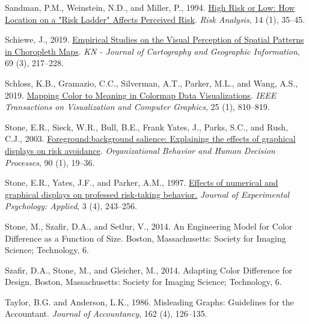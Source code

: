 \documentclass[
]{interact}
\newlength{\cslhangindent}
\newlength{\cslentryspacingunit} %
\newenvironment{CSLReferences}[2] %
 {%
  \setlength{\parindent}{0pt}
  \ifodd #1
  \let\oldpar\par
  \def\par{\hangindent=\cslhangindent\oldpar}
  \fi
  \setlength{\parskip}{#2\cslentryspacingunit}
 }%
 {}
\begin{document}
\begin{CSLReferences}{1}{0}
\leavevmode{}%
Sandman, P.M., Weinstein, N.D., and Miller, P., 1994.
\href{https://doi.org/10.1111/j.1539-6924.1994.tb00026.x}{High {Risk} or
{Low}: {How} {Location} on a "{Risk} {Ladder}" {Affects} {Perceived}
{Risk}}. \emph{Risk Analysis}, 14 (1), 35--45.

\leavevmode{}%
Schiewe, J., 2019.
\href{https://doi.org/10.1007/s42489-019-00026-y}{Empirical {Studies} on
the {Visual} {Perception} of {Spatial} {Patterns} in {Choropleth}
{Maps}}. \emph{KN - Journal of Cartography and Geographic Information},
69 (3), 217--228.

\leavevmode{}%
Schloss, K.B., Gramazio, C.C., Silverman, A.T., Parker, M.L., and Wang,
A.S., 2019. \href{https://doi.org/10.1109/TVCG.2018.2865147}{Mapping
{Color} to {Meaning} in {Colormap} {Data} {Visualizations}}. \emph{IEEE
Transactions on Visualization and Computer Graphics}, 25 (1), 810--819.

\leavevmode{}%
Stone, E.R., Sieck, W.R., Bull, B.E., Frank Yates, J., Parks, S.C., and
Rush, C.J., 2003.
\href{https://doi.org/10.1016/S0749-5978(03)00003-7}{Foreground:background
salience: {Explaining} the effects of graphical displays on risk
avoidance}. \emph{Organizational Behavior and Human Decision Processes},
90 (1), 19--36.

\leavevmode{}%
Stone, E.R., Yates, J.F., and Parker, A.M., 1997.
\href{https://doi.org/10.1037/1076-898X.3.4.243}{Effects of numerical
and graphical displays on professed risk-taking behavior.} \emph{Journal
of Experimental Psychology: Applied}, 3 (4), 243--256.

\leavevmode{}%
Stone, M., Szaﬁr, D.A., and Setlur, V., 2014. An {Engineering} {Model}
for {Color} {Difference} as a {Function} of {Size}. Boston,
Massachusetts: Society for Imaging Science; Technology, 6.

\leavevmode{}%
Szafir, D.A., Stone, M., and Gleicher, M., 2014. Adapting {Color}
{Difference} for {Design}. Boston, Massachusetts: Society for Imaging
Science; Technology, 6.

\leavevmode{}%
Taylor, B.G. and Anderson, L.K., 1986. Misleading {Graphs}: {Guidelines}
for the {Accountant}. \emph{Journal of Accountancy}, 162 (4), 126--135.


\end{CSLReferences}
\end{document}

